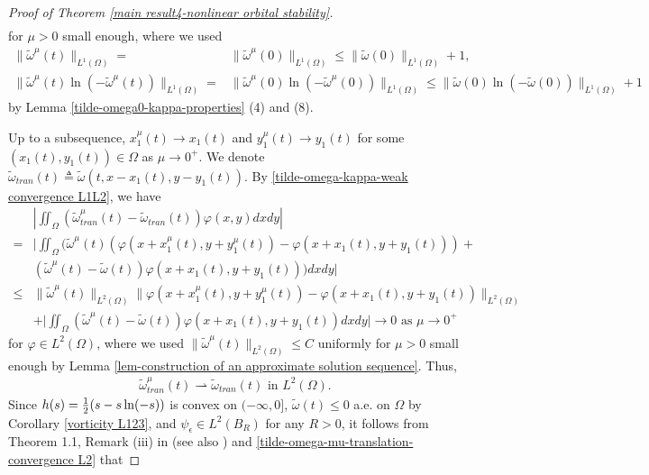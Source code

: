 \documentclass[1 [leqno, 11pt]{amsart}
\numberwithin{equation}{section}
\let\ep=\epsilon
\begin{document}
\begin{CJK*}{GBK}{song}
\begin{proof}[Proof of  Theorem \ref{main result4-nonlinear orbital stability}]
\begin{align}
\end{align}
for $\mu>0$ small enough, where we used
\begin{align*}
\|\tilde\omega^\mu(t)\|_{L^1(\Omega)}=&\|\tilde\omega^\mu(0)\|_{L^1(\Omega)}\leq \|\tilde\omega(0)\|_{L^1(\Omega)}+1,\\
\|\tilde \omega^\mu(t)\ln(-\tilde \omega^\mu(t))\|_{L^1(\Omega)}=&\|\tilde \omega^\mu(0)\ln(-\tilde \omega^\mu(0))\|_{L^1(\Omega)}\leq
\|\tilde \omega(0)\ln(-\tilde \omega(0))\|_{L^1(\Omega)}+1
\end{align*}
by Lemma \ref{tilde-omega0-kappa-properties} (4) and (8).


Up to a subsequence,  $x_1^\mu(t)\to x_1(t)$ and $y_1^\mu(t)\to y_1(t)$ for some $(x_1(t), y_1(t))\in\Omega$ as $\mu\to0^+$. We denote $\tilde \omega_{tran}(t)\triangleq\tilde \omega(t,x-x_1(t),y-y_1(t))$.
 By \eqref{tilde-omega-kappa-weak convergence L1L2}, we have
\begin{align*}
&\left|\iint_\Omega\left(\tilde \omega_{tran}^\mu(t)-\tilde \omega_{tran}(t)\right)\varphi(x,y)dxdy\right|\\
=&\bigg|\iint_\Omega\bigg(\tilde \omega^\mu(t)(\varphi(x+x_1^\mu(t),y+y_1^\mu(t))-\varphi(x+x_1(t),y+y_1(t)))+\\
&(\tilde \omega^\mu(t)-\tilde \omega(t))\varphi(x+x_1(t),y+y_1(t))\bigg)dxdy\bigg|\\
\leq&\|\tilde \omega^\mu(t)\|_{L^2(\Omega)}\|\varphi(x+x_1^\mu(t),y+y_1^\mu(t))-\varphi(x+x_1(t),y+y_1(t))\|_{L^2(\Omega)}\\
&+\bigg|\iint_\Omega
(\tilde \omega^\mu(t)-\tilde \omega(t))\varphi(x+x_1(t),y+y_1(t))dxdy\bigg|\to0\text{ as } \mu\to0^+
\end{align*}
for $\varphi\in L^2(\Omega)$,
where we used  $\|\tilde \omega^\mu(t)\|_{L^2(\Omega)}\leq C$ uniformly for $\mu>0$ small enough by Lemma \ref{lem-construction of an approximate solution sequence}.
Thus,
\begin{align}\label{tilde-omega-mu-translation-convergence L2}
\tilde \omega_{tran}^\mu(t)\rightharpoonup\tilde \omega_{tran}(t) \text{ in } L^2(\Omega).
\end{align}
Since $h(s)={1\over2}(s-s\ln(-s))$ is convex on $(-\infty,0]$, $\tilde \omega(t)\leq0$ a.e. on $\Omega$ by Corollary \ref{vorticity L123}, and $\psi_\ep \in L^2(B_R)$ for any $R>0$, it follows from  Theorem 1.1, Remark (iii) in \cite{Dacorogna} (see also \cite{Morrey1966})  and  \eqref{tilde-omega-mu-translation-convergence L2}  that

\end{proof}
\end{CJK*}
\end{document}
